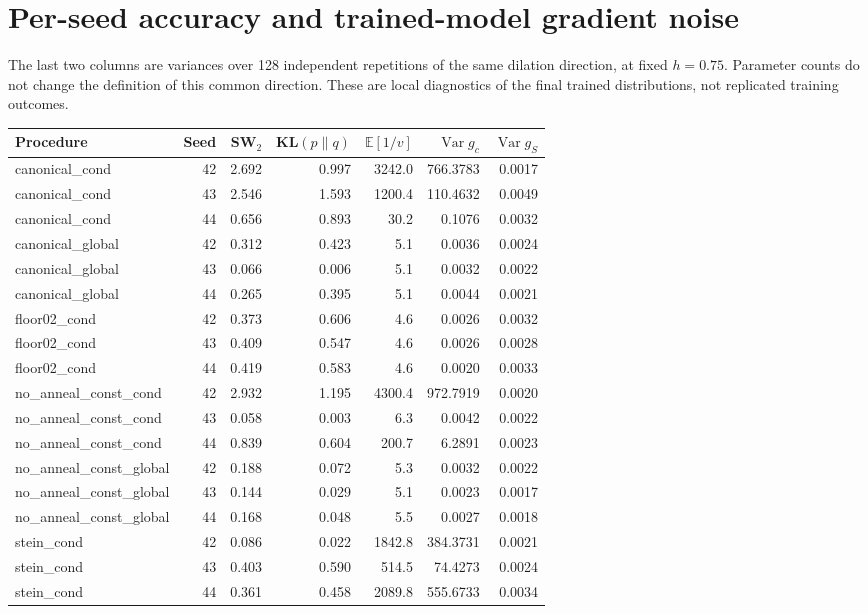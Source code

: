 \documentclass[11pt,a4paper]{article}
\numberwithin{equation}{section}
\newcommand{\E}{\mathbb E}
\newcommand{\Var}{\operatorname{Var}}
\begin{document}
\section{Per-seed accuracy and trained-model gradient noise}
The last two columns are variances over 128 independent repetitions of the
same dilation direction, at fixed $h=0.75$. Parameter counts do not change
the definition of this common direction. These are local diagnostics of
the final trained distributions, not replicated training outcomes.
\small
\begin{longtable}{p{4.25cm}rrrrrr}\toprule
Procedure & Seed & SW$_2$ & KL$(p\|q)$ & $\E[1/v]$ & $\Var g_c$ & $\Var g_S$\\\midrule
\endhead
canonical\_cond & 42 & 2.692 & 0.997 & 3242.0 & 766.3783 & 0.0017 \\
canonical\_cond & 43 & 2.546 & 1.593 & 1200.4 & 110.4632 & 0.0049 \\
canonical\_cond & 44 & 0.656 & 0.893 & 30.2 & 0.1076 & 0.0032 \\
canonical\_global & 42 & 0.312 & 0.423 & 5.1 & 0.0036 & 0.0024 \\
canonical\_global & 43 & 0.066 & 0.006 & 5.1 & 0.0032 & 0.0022 \\
canonical\_global & 44 & 0.265 & 0.395 & 5.1 & 0.0044 & 0.0021 \\
floor02\_cond & 42 & 0.373 & 0.606 & 4.6 & 0.0026 & 0.0032 \\
floor02\_cond & 43 & 0.409 & 0.547 & 4.6 & 0.0026 & 0.0028 \\
floor02\_cond & 44 & 0.419 & 0.583 & 4.6 & 0.0020 & 0.0033 \\
no\_anneal\_const\_cond & 42 & 2.932 & 1.195 & 4300.4 & 972.7919 & 0.0020 \\
no\_anneal\_const\_cond & 43 & 0.058 & 0.003 & 6.3 & 0.0042 & 0.0022 \\
no\_anneal\_const\_cond & 44 & 0.839 & 0.604 & 200.7 & 6.2891 & 0.0023 \\
no\_anneal\_const\_global & 42 & 0.188 & 0.072 & 5.3 & 0.0032 & 0.0022 \\
no\_anneal\_const\_global & 43 & 0.144 & 0.029 & 5.1 & 0.0023 & 0.0017 \\
no\_anneal\_const\_global & 44 & 0.168 & 0.048 & 5.5 & 0.0027 & 0.0018 \\
stein\_cond & 42 & 0.086 & 0.022 & 1842.8 & 384.3731 & 0.0021 \\
stein\_cond & 43 & 0.403 & 0.590 & 514.5 & 74.4273 & 0.0024 \\
stein\_cond & 44 & 0.361 & 0.458 & 2089.8 & 555.6733 & 0.0034 \\

\end{longtable}
\end{document}
